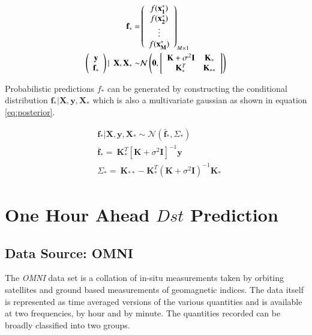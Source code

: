 \documentclass{article}
\begin{document}
\begin{align}
  \mathbf{f}_* = & \left( \begin{array}{c} f(\mathbf{x^{*}_1}) \\ f(\mathbf{x^{*}_2}) \\ \vdots \\ f(\mathbf{x^{*}_M}) \end{array} \right)_{M \times 1} \\
  \vspace{4\baselineskip}
  \left( \begin{array}{c} \mathbf{y} \\ \mathbf{f_*} \end{array} \right) | \ \ \mathbf{X}, \mathbf{X}_* \sim & 
                                                                                                               \mathcal{N}\left(\mathbf{0}, \left[ \begin{array}{cc} \mathbf{K} + \sigma^{2} \mathbf{I} & \mathbf{K}_{*} \\ \mathbf{K}_{*}^T & \mathbf{K}_{**} \end{array} \right ] \right) \label{eq:dist}
\end{align}

Probabilistic predictions $f_*$ can be generated by constructing the
conditional distribution
$\mathbf{f_*}|\mathbf{X},\mathbf{y},\mathbf{X_*}$ which is also a
multivariate gaussian as shown in equation \ref{eq:posterior}.

\begin{align}
  & \mathbf{f_*}|\mathbf{X},\mathbf{y},\mathbf{X_*} \sim \mathcal{N}(\mathbf{\bar{f}_*}, \Sigma_*)  \label{eq:posterior} \\
  & \mathbf{\bar{f}_*} =  \ \mathbf{K}^T_{*} [\mathbf{K} + \sigma^{2} \mathbf{I}]^{-1} \mathbf{y} \label{eq:posteriormean} \\
  & \Sigma_* = \ \mathbf{K}_{**} - \mathbf{K}^T_{*} \left(\mathbf{K} + \sigma^{2} \mathbf{I}\right)^{-1} \mathbf{K}_{*} \label{eq:posteriorcov}
\end{align}

\section{One Hour Ahead $Dst$ Prediction} \label{sec:osa}

\subsection{Data Source: OMNI}
The \emph{OMNI} data set is a collation of in-situ measurements taken
by orbiting satellites and ground based measurements of geomagnetic
indices. The data itself is represented as time averaged versions of
the various quantities and is available at two frequencies, by hour
and by minute. The quantities recorded can be broadly classified into
two groups.
\end{document}
